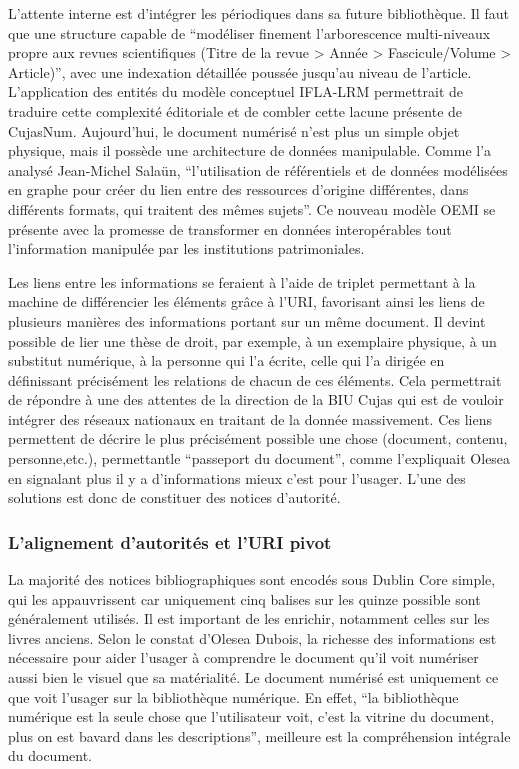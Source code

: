 L'attente interne est d'intégrer les périodiques dans sa future bibliothèque. Il faut que une structure capable de \enquote{modéliser finement l'arborescence multi-niveaux propre aux revues scientifiques (Titre de la revue > Année > Fascicule/Volume > Article)}, avec une indexation détaillée poussée jusqu'au niveau de l'article. L'application des entités du modèle conceptuel IFLA-LRM permettrait de traduire cette complexité éditoriale et de combler cette lacune présente de CujasNum. Aujourd'hui, le document numérisé n'est plus un simple objet physique, mais il possède une architecture de données manipulable. Comme l'a analysé Jean-Michel Salaün, \enquote{l'utilisation de référentiels et de données modélisées en graphe pour créer du lien entre des ressources d'origine différentes, dans différents formats, qui traitent des mêmes sujets}. Ce nouveau modèle OEMI se présente avec la promesse de transformer en données interopérables tout l'information manipulée par les institutions patrimoniales. 

Les liens entre les informations se feraient à l'aide de triplet permettant à la machine de différencier les éléments grâce à l'URI, favorisant ainsi les liens de plusieurs manières des informations portant sur un même document. Il devint possible de lier une thèse de droit, par exemple, à un exemplaire physique, à un substitut numérique, à la personne qui l'a écrite, celle qui l'a dirigée en définissant précisément les relations de chacun de ces éléments. Cela permettrait de répondre à une des attentes de la direction de la BIU Cujas qui est de vouloir intégrer des réseaux nationaux en traitant de la donnée massivement. Ces liens permettent de décrire le plus précisément possible une chose (document, contenu, personne,etc.), permettantle \enquote{passeport du document}, comme l'expliquait Olesea en signalant plus il y a d'informations mieux c'est pour l'usager. L'une des solutions est donc de constituer des notices d'autorité.

\subsubsection{L'alignement d'autorités et l'URI pivot}
La majorité des notices bibliographiques sont encodés sous Dublin Core simple, qui les appauvrissent car uniquement cinq balises sur les quinze possible sont généralement utilisés. Il est important de les enrichir, notamment celles sur les livres anciens. Selon le constat d'Olesea Dubois, la richesse des informations est nécessaire pour aider l'usager à comprendre le document qu'il voit numériser aussi bien le visuel que sa matérialité. Le document numérisé est uniquement ce que voit l'usager sur la bibliothèque numérique. En effet, \enquote{la bibliothèque numérique est la seule chose que l'utilisateur voit, c'est la vitrine du document, plus on est bavard dans les descriptions}, meilleure est la compréhension intégrale du document. 

